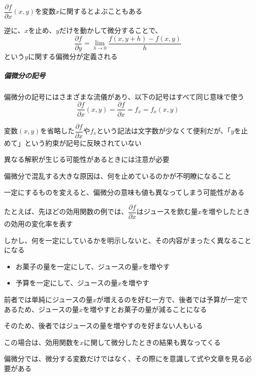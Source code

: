 \documentclass[../book_jiriki_calc]{subfiles}
\begin{document}
$\dfrac{\partial f}{\partial x}(x,y)$を変数$x$に関するとよぶこともある

\br

逆に、$x$を止め、$y$だけを動かして微分することで、
\begin{equation*}
  \frac{\partial f}{\partial y} = \lim_{h \to 0} \frac{f(x, y + h) - f(x, y)}{h}
\end{equation*}
という$y$に関する偏微分が定義される

\br

\subparagraph{偏微分の記号}

偏微分の記号にはさまざまな流儀があり、以下の記号はすべて同じ意味で使う
\begin{equation*}
  \frac{\partial f}{\partial x}(x, y) = \dfrac{\partial f}{\partial x} =f_x = f_x(x, y)
\end{equation*}

\br

変数$(x,y)$を省略した$\dfrac{\partial f}{\partial x}$や$f_x$という記法は文字数が少なくて便利だが、「$y$を止めて」という約束が記号に反映されていない

異なる解釈が生じる可能性があるときには注意が必要

\sectionline

偏微分で混乱する大きな原因は、何を止めているのかが不明瞭になること

一定にするものを変えると、偏微分の意味も値も異なってしまう可能性がある

\br

たとえば、先ほどの効用関数の例では、$\dfrac{\partial f}{\partial x}$はジュースを飲む量$x$を増やしたときの効用の変化率を表す

しかし、何を一定にしているかを明示しないと、その内容がまったく異なることになる
\begin{itemize}
  \item お菓子の量を一定にして、ジュースの量$x$を増やす
  \item 予算を一定にして、ジュースの量$x$を増やす
\end{itemize}
前者では単純にジュースの量$x$が増えるのを好む一方で、後者では予算が一定であるため、ジュースの量$x$を増やすとお菓子の量が減ることになる

そのため、後者ではジュースの量を増やすのを好まない人もいる

この場合は、効用関数を$x$に関して微分したときの結果も異なってくる

\br

偏微分では、微分する変数だけではなく、その際にを意識して式や文章を見る必要がある
\end{document}
